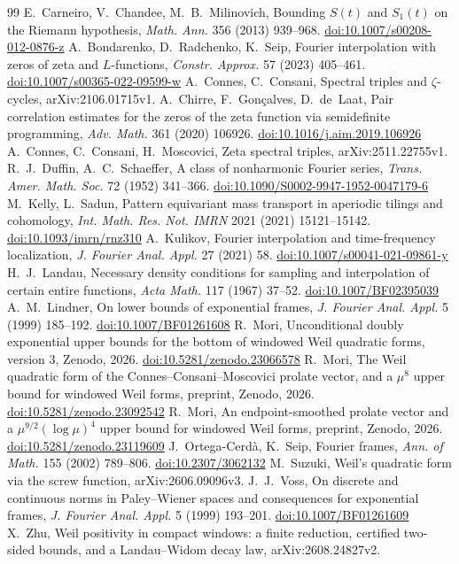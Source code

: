 \documentclass[11pt]{amsart}
\newcommand{\doi}[1]{\href{https://doi.org/#1}{doi:#1}}
\theoremstyle{definition}
\theoremstyle{remark}
\numberwithin{equation}{section}
\begin{document}
\begin{thebibliography}{99}
 E.~Carneiro, V.~Chandee, M.~B.~Milinovich, Bounding $S(t)$ and $S_1(t)$ on the Riemann hypothesis, \emph{Math. Ann.} 356 (2013) 939--968. \doi{10.1007/s00208-012-0876-z}
 A.~Bondarenko, D.~Radchenko, K.~Seip, Fourier interpolation with zeros of zeta and $L$-functions, \emph{Constr. Approx.} 57 (2023) 405--461. \doi{10.1007/s00365-022-09599-w}
 A.~Connes, C.~Consani, Spectral triples and $\zeta$-cycles, arXiv:2106.01715v1.
 A.~Chirre, F.~Gon\c{c}alves, D.~de~Laat, Pair correlation estimates for the zeros of the zeta function via semidefinite programming, \emph{Adv. Math.} 361 (2020) 106926. \doi{10.1016/j.aim.2019.106926}
 A.~Connes, C.~Consani, H.~Moscovici, Zeta spectral triples, arXiv:2511.22755v1.
 R.~J.~Duffin, A.~C.~Schaeffer, A class of nonharmonic Fourier series, \emph{Trans. Amer. Math. Soc.} 72 (1952) 341--366. \doi{10.1090/S0002-9947-1952-0047179-6}
 M.~Kelly, L.~Sadun, Pattern equivariant mass transport in aperiodic tilings and cohomology, \emph{Int. Math. Res. Not. IMRN} 2021 (2021) 15121--15142. \doi{10.1093/imrn/rnz310}
 A.~Kulikov, Fourier interpolation and time-frequency localization, \emph{J. Fourier Anal. Appl.} 27 (2021) 58. \doi{10.1007/s00041-021-09861-y}
 H.~J.~Landau, Necessary density conditions for sampling and interpolation of certain entire functions, \emph{Acta Math.} 117 (1967) 37--52. \doi{10.1007/BF02395039}
 A.~M.~Lindner, On lower bounds of exponential frames, \emph{J. Fourier Anal. Appl.} 5 (1999) 185--192. \doi{10.1007/BF01261608}
 R.~Mori, Unconditional doubly exponential upper bounds for the bottom of windowed Weil quadratic forms, version 3, Zenodo, 2026. \doi{10.5281/zenodo.23066578}
 R.~Mori, The Weil quadratic form of the Connes--Consani--Moscovici prolate vector, and a $\mu^8$ upper bound for windowed Weil forms, preprint, Zenodo, 2026. \doi{10.5281/zenodo.23092542}
 R.~Mori, An endpoint-smoothed prolate vector and a $\mu^{9/2}(\log\mu)^4$ upper bound for windowed Weil forms, preprint, Zenodo, 2026. \doi{10.5281/zenodo.23119609}
 J.~Ortega-Cerd\`a, K.~Seip, Fourier frames, \emph{Ann. of Math.} 155 (2002) 789--806. \doi{10.2307/3062132}
 M.~Suzuki, Weil's quadratic form via the screw function, arXiv:2606.09096v3.
 J.~J.~Voss, On discrete and continuous norms in Paley--Wiener spaces and consequences for exponential frames, \emph{J. Fourier Anal. Appl.} 5 (1999) 193--201. \doi{10.1007/BF01261609}
 X.~Zhu, Weil positivity in compact windows: a finite reduction, certified two-sided bounds, and a Landau--Widom decay law, arXiv:2608.24827v2.
\end{thebibliography}
\end{document}
